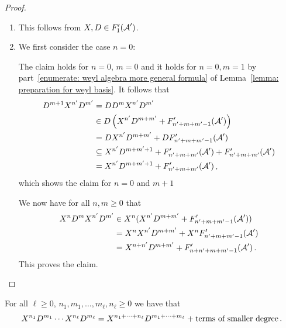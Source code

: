 \begin{proof}
  \leavevmode
  \begin{enumerate}
    \item
      This follows from $X, D \in F'_1(\operatorname{\mathcal{A}}')$.
    \item
      We first consider the case $n = 0$:
      
      The claim holds for $n = 0$, $m = 0$ and it holds for $n = 0, m = 1$ by part~\ref*{enumerate: weyl algebra more general formula} of Lemma~\ref{lemma: preparation for weyl basis}.
      It follows that
      \begin{align*}
                    D^{m+1} X^{n'} D^{m'}
        &=          D D^{m} X^{n'} D^{m'}                                         \\
        &\in        D \left( X^{n'} D^{m+m'} + F'_{n'+m+m'-1}(\operatorname{\mathcal{A}}') \right)    \\
        &=          D X^{n'} D^{m+m'} + D F'_{n'+m+m'-1}(\operatorname{\mathcal{A}}')                 \\
        &\subseteq    X^{n'} D^{m+m'+1}
                    + F'_{n'+m+m'}(\operatorname{\mathcal{A}}')
                    + F'_{n'+m+m'}(\operatorname{\mathcal{A}}')                                       \\
        &=            X^{n'} D^{m+m'+1}
                    + F'_{n'+m+m'}(\operatorname{\mathcal{A}}') \,,
      \end{align*}
      which shows the claim for $n = 0$ and $m+1$
      
      We now have for all $n, m \geq 0$ that
      \begin{align*}
              X^n D^m X^{n'} D^{m'}
        &\in  X^n ( X^{n'} D^{m + m'} + F'_{n' + m + m' - 1}(\operatorname{\mathcal{A}}') )  \\
        &=    X^n X^{n'} D^{m + m'} + X^n F'_{n' + m + m'- 1}(\operatorname{\mathcal{A}}')   \\
        &=    X^{n + n'} D^{m + m'} + F'_{n + n' + m + m' - 1}(\operatorname{\mathcal{A}}')  \,.
      \end{align*}
      This proves the claim.
    \qedhere
  \end{enumerate}
\end{proof}


\begin{corollary}
  \label{corollary: multiple monomials commute up to smaller degree}
  For all $\ell \geq 0$, $n_1, m_1, \dotsc, m_\ell, n_\ell \geq 0$ we have that
  \[
      X^{n_1} D^{m_1} \dotsm X^{n_\ell} D^{m_\ell}  \\
    = X^{n_1 + \dotsb + n_\ell} D^{m_1 + \dotsb + m_\ell}
      + \text{terms of smaller degree} \,.
  \]
\end{corollary}


